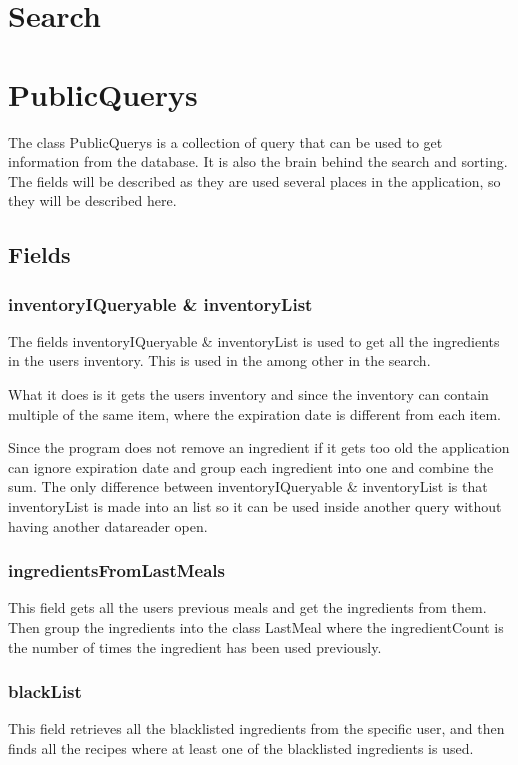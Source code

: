 \chapter{Search}

\chapter{PublicQuerys} \label{chp:PublicQuerys}
The class PublicQuerys is a collection of query that can be used to get information from the database. It is also the brain behind the search and sorting.
The fields will be described as they are used several places in the application, so they will be described here.

\section{Fields}
\subsection{inventoryIQueryable \& inventoryList}
The fields inventoryIQueryable \& inventoryList is used to get all the ingredients in the users inventory. This is used in the among other in the search.

What it does is it gets the users inventory and since the inventory can contain multiple of the same item, where the expiration date is different from each item.

Since the program does not remove an ingredient if it gets too old the application can ignore expiration date and group each ingredient into one and combine the sum. The only difference between inventoryIQueryable \& inventoryList is that inventoryList is made into an list so it can be used inside another query without having another datareader open.

\subsection{ingredientsFromLastMeals}
This field gets all the users previous meals and get the ingredients from them. Then group the ingredients into the class LastMeal where the ingredientCount is the number of times the ingredient has been used previously.

\subsection{blackList}

This field retrieves all the blacklisted ingredients from the specific user, and then finds all the recipes where at least one of the blacklisted ingredients is used.


